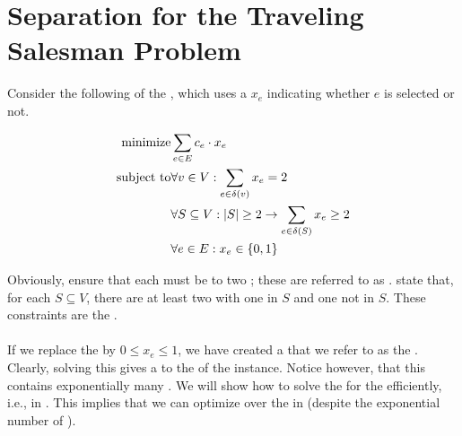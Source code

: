 \section{Separation for the Traveling Salesman Problem}
Consider the following  of the , which uses a  $x_e$ indicating whether  $e$ is selected or not.

\begin{eqnarray}
\mbox{minimize}&\sumdomain[e]{E}{c_e\cdot x_e}\eqnlab{stsp-m}\\
\mbox{subject to}&\forall v\in V:\sumdomain[e]{\fun{\delta}{v}}x_e=2\eqnlab{stsp-c1}\\
&\forall S\subseteq V:\abs{S}\geq2\rightarrow\sumdomain[e]{\fun{\delta}{S}}x_e\geq 2\eqnlab{stsp-c2}\\
&\forall e\in E:x_e\in\accl{0,1}\eqnlab{stsp-c3}
\end{eqnarray}

Obviously,   ensure that each  must be  to two ; these  are referred to as .   state that, for each  $S\subseteq V$, there are at least two  with one  in $S$ and one  not in $S$. These constraints are the .

\paragraph{}
If we replace the   by $0\leq x_e\leq 1$, we have created a  that we refer to as the . Clearly, solving this  gives a  to the  of the  instance. Notice however, that this  contains exponentially many . We will show how to solve the  for the  efficiently, i.e., in . This implies that we can optimize over the  in  (despite the exponential number of ).

